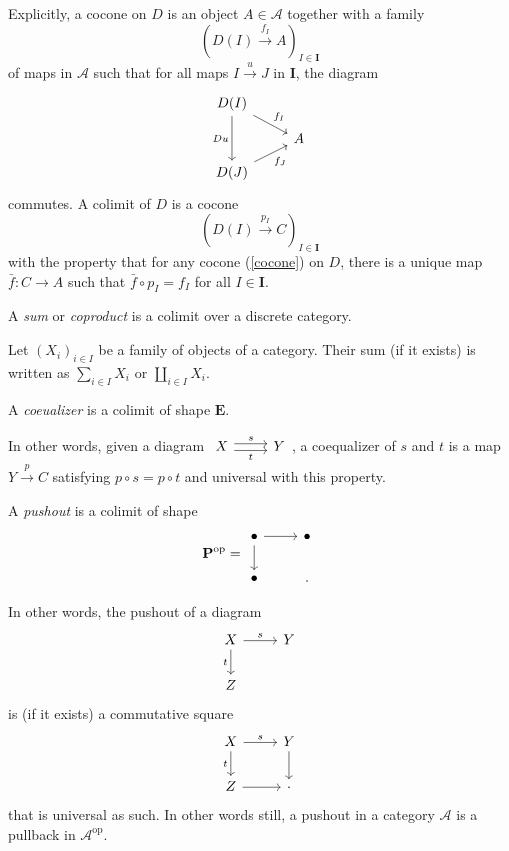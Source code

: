 Explicitly, a cocone on $D$ is an object $A\in \mathscr{A}$ together with a family
\begin{equation}
  \left( D(I)\xrightarrow{f_I} A\right) _{I\in \mathbf{I}}\label{cocone}
\end{equation}of maps in $\mathscr{A}$ such that for all maps $I\xrightarrow{u}J$ in $\mathbf{I}$, the diagram
\[
  \begin{tikzcd}[row sep=small]
  D(I)\arrow[dd, "Du"'] \arrow[rd,"f_I"] &\\
					 & A\\
					 D(J) \arrow[ru,"f_J"'] 
\end{tikzcd}
\] 
commutes. A colimit of $D$ is a cocone
\[
  \left( D(I)\xrightarrow{p_I}C \right) _{I\in \mathbf{I}}
\] with the property that for any cocone (\ref{cocone}) on $D$, there is a unique map $\bar{f}:C\to A$ such that $\bar{f}\circ p_I=f_I$ for all  $I\in \mathbf{I}$. 

\begin{definition}
  A \textit{sum} or \textit{coproduct} is a colimit over a discrete category. 
\end{definition}

Let $(X_i)_{i\in I}$ be a family of objects of a category. Their sum (if it exists) is written as $\sum_{i\in I}^{} X_i$ or $\coprod_{i \in I}X_i $.

\begin{definition}
  A \textit{coeualizer} is a colimit of shape $\mathbf{E}$.
\end{definition}

In other words, given a diagram $
\begin{tikzcd}
  X\arrow[r,shift left,"s"] \arrow[r,shift right,"t"'] &Y
\end{tikzcd}$, a coequalizer of $s$ and $t$ is a map $Y\xrightarrow{p}C$ satisfying $p\circ s=p\circ t$ and universal with this property.

\begin{definition}
  A \textit{pushout} is a colimit of shape
  \[
    \mathbf{P}^{\mathrm{op}}=\begin{tikzcd}
    \bullet \arrow[r] \arrow[d] &\bullet\\
    \bullet & .
  \end{tikzcd}
  \] 
\end{definition}

In other words, the pushout of a diagram
\begin{equation}
  \begin{tikzcd}
    X\arrow[r,"s"]\arrow[d,"t"']  &Y\\
    Z &
  \end{tikzcd}
\end{equation}
is (if it exists) a commutative square
\[
\begin{tikzcd}
  X \arrow[r,"s"] \arrow[d,"t"'] &Y\arrow[d] \\
  Z \arrow[r] &\cdot  
\end{tikzcd}
\] 
that is universal as such. In other words still, a pushout in a category $\mathscr{A}$ is a pullback in $\mathscr{A}^{\mathrm{op}}$.

